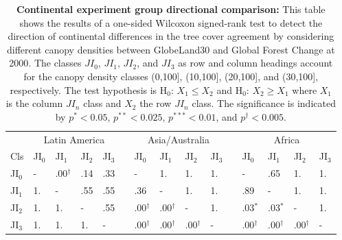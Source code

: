 			\begin{table}[ht]
				\centering
				\caption[Continental experiment group directional comparison]{\textbf{Continental experiment group directional comparison:} This table shows the results of a one-sided Wilcoxon signed-rank test to detect the direction of continental differences in the tree cover agreement by considering different canopy densities between GlobeLand30 and Global Forest Change at 2000. The classes $JI_0$, $JI_1$, $JI_2$, and $JI_3$ as row and column headings account for the canopy density classes (0,100], (10,100], (20,100], and (30,100], respectively. The test hypothesis is H$_0$: $X_1\leq X_2$ and H$_0$: $X_2\geq X_1$ where $X_1$ is the column $JI_n$ class and $X_2$ the row $JI_n$ class. The significance is indicated by $p^{*}<0.05$, $p^{**}<0.025$, $p^{***}<0.01$, and $p^{\dagger}<0.005$.}
				\label{tab:wilcoxononesided_regions}
				\begin{tabular}{lllllllllllllll}
					\hline
					& \multicolumn{4}{c}{Latin America} && \multicolumn{4}{c}{Asia/Australia} && \multicolumn{4}{c}{Africa} \\\cline{2-5}\cline{7-10}\cline{12-15}
					Cls & JI$_0$ & JI$_1$ & JI$_2$ & JI$_3$ && JI$_0$ & JI$_1$ & JI$_2$ & JI$_3$ && JI$_0$ & JI$_1$ & JI$_2$ & JI$_3$ \\\hline
					JI$_0$ & - & .00$^{\dagger}$ & .14 & .33 && - & 1. & 1. & 1. && - & .65 & 1. & 1. \\
					JI$_1$ & 1. & - & .55 & .55 && .36 & - & 1. & 1. && .89 & - & 1. & 1. \\
					JI$_2$ & 1. & 1. & - & .55 && .00$^{\dagger}$ & .00$^{\dagger}$ & - & 1. && .03$^{*}$ & .03$^{*}$ & - & 1. \\
					JI$_3$ & 1. & 1. & 1. & - && .00$^{\dagger}$ & .00$^{\dagger}$ & .00$^{\dagger}$ & - && .00$^{\dagger}$ & .00$^{\dagger}$ & .00$^{\dagger}$ & - \\\hline
				\end{tabular}
			\end{table}

